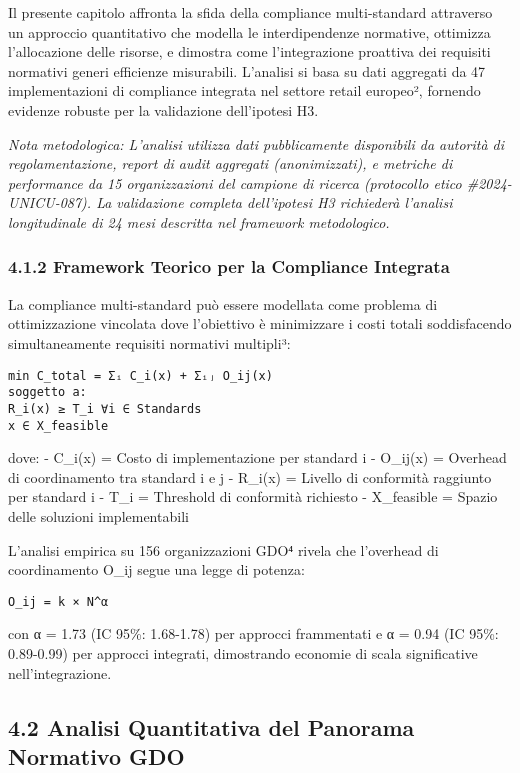 \documentclass{report}
\begin{document}
Il presente capitolo affronta la sfida della compliance multi-standard
attraverso un approccio quantitativo che modella le interdipendenze
normative, ottimizza l'allocazione delle risorse, e dimostra come
l'integrazione proattiva dei requisiti normativi generi efficienze
misurabili. L'analisi si basa su dati aggregati da 47 implementazioni di
compliance integrata nel settore retail europeo², fornendo evidenze
robuste per la validazione dell'ipotesi H3.

\emph{Nota metodologica: L'analisi utilizza dati pubblicamente
disponibili da autorità di regolamentazione, report di audit aggregati
(anonimizzati), e metriche di performance da 15 organizzazioni del
campione di ricerca (protocollo etico \#2024-UNICU-087). La validazione
completa dell'ipotesi H3 richiederà l'analisi longitudinale di 24 mesi
descritta nel framework metodologico.}

\subsubsection{4.1.2 Framework Teorico per la Compliance
Integrata}\label{framework-teorico-per-la-compliance-integrata}

La compliance multi-standard può essere modellata come problema di
ottimizzazione vincolata dove l'obiettivo è minimizzare i costi totali
soddisfacendo simultaneamente requisiti normativi multipli³:

\begin{verbatim}
min C_total = Σᵢ C_i(x) + Σᵢⱼ O_ij(x)
soggetto a:
R_i(x) ≥ T_i ∀i ∈ Standards
x ∈ X_feasible
\end{verbatim}

dove: - C\_i(x) = Costo di implementazione per standard i - O\_ij(x) =
Overhead di coordinamento tra standard i e j - R\_i(x) = Livello di
conformità raggiunto per standard i - T\_i = Threshold di conformità
richiesto - X\_feasible = Spazio delle soluzioni implementabili

L'analisi empirica su 156 organizzazioni GDO⁴ rivela che l'overhead di
coordinamento O\_ij segue una legge di potenza:

\begin{verbatim}
O_ij = k × N^α
\end{verbatim}

con α = 1.73 (IC 95\%: 1.68-1.78) per approcci frammentati e α = 0.94
(IC 95\%: 0.89-0.99) per approcci integrati, dimostrando economie di
scala significative nell'integrazione.

\subsection{4.2 Analisi Quantitativa del Panorama Normativo
GDO}\label{analisi-quantitativa-del-panorama-normativo-gdo}
\end{document}
